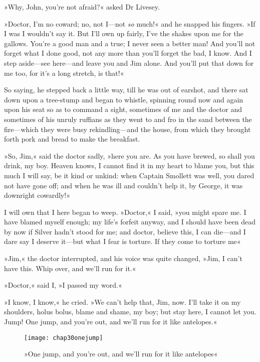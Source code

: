 »Why, John, you're not afraid?« asked Dr Livesey.

»Doctor, I'm no coward; no, not I—not \textit{so} much!« and he snapped his fingers. »If I was I wouldn't say it. But I'll own up fairly, I've the shakes upon me for the gallows. You're a good man and a true; I never seen a better man! And you'll not forget what I done good, not any more than you'll forget the bad, I know. And I step aside—see here—and leave you and Jim alone. And you'll put that down for me too, for it's a long stretch, is that!«

So saying, he stepped back a little way, till he was out of earshot, and there sat down upon a tree-stump and began to whistle, spinning round now and again upon his seat so as to command a sight, sometimes of me and the doctor and sometimes of his unruly ruffians as they went to and fro in the sand between the fire—which they were busy rekindling—and the house, from which they brought forth pork and bread to make the breakfast.

»So, Jim,« said the doctor sadly, »here you are. As you have brewed, so shall you drink, my boy. Heaven knows, I cannot find it in my heart to blame you, but this much I will say, be it kind or unkind: when Captain Smollett was well, you dared not have gone off; and when he was ill and couldn't help it, by George, it was downright cowardly!«

I will own that I here began to weep. »Doctor,« I said, »you might spare me. I have blamed myself enough; my life's forfeit anyway, and I should have been dead by now if Silver hadn't stood for me; and doctor, believe this, I can die—and I dare say I deserve it—but what I fear is torture. If they come to torture me\longdash«

»Jim,« the doctor interrupted, and his voice was quite changed, »Jim, I can't have this. Whip over, and we'll run for it.«

»Doctor,« said I, »I passed my word.«

»I know, I know,« he cried. »We can't help that, Jim, now. I'll take it on my shoulders, holus bolus, blame and shame, my boy; but stay here, I cannot let you. Jump! One jump, and you're out, and we'll run for it like antelopes.«

\begin{figure}[p]
\centering
\texttt{[image: chap30onejump]}
\caption[»One jump, and we'll run for it«]{»One jump, and you're out, and we'll run for it like antelopes«}
\end{figure}  

